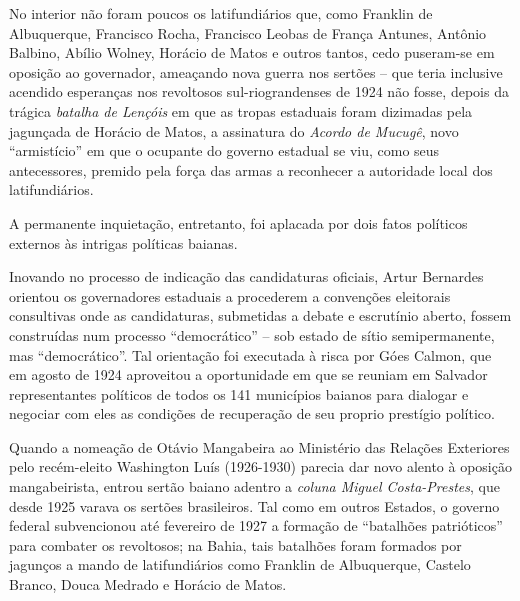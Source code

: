 No interior não foram poucos os latifundiários que, como Franklin de Albuquerque, Francisco Rocha, Francisco Leobas de França Antunes, Antônio Balbino, Abílio Wolney, Horácio de Matos e outros tantos, cedo puseram-se em oposição ao governador, ameaçando nova guerra nos sertões -- que teria inclusive acendido esperanças nos revoltosos sul-riograndenses de 1924 não fosse, depois da trágica \textit{batalha de Lençóis} em que as tropas estaduais foram dizimadas pela jagunçada de Horácio de Matos, a assinatura do \textit{Acordo de Mucugê}, novo ``armistício'' em que o ocupante do governo estadual se viu, como seus antecessores, premido pela força das armas a reconhecer a autoridade local dos latifundiários.

A permanente inquietação, entretanto, foi aplacada por dois fatos políticos externos às intrigas políticas baianas. 

Inovando no processo de indicação das candidaturas oficiais, Artur Bernardes orientou os governadores estaduais a procederem a convenções eleitorais consultivas onde as candidaturas, submetidas a debate e escrutínio aberto, fossem construídas num processo ``democrático'' -- sob estado de sítio semipermanente, mas ``democrático''. Tal orientação foi executada à risca por Góes Calmon, que em agosto de 1924 aproveitou a oportunidade em que se reuniam em Salvador representantes políticos de todos os 141 municípios baianos para dialogar e negociar com eles as condições de recuperação de seu proprio prestígio político. 

Quando a nomeação de Otávio Mangabeira ao Ministério das Relações Exteriores pelo recém-eleito Washington Luís (1926-1930) parecia dar novo alento à oposição mangabeirista, entrou sertão baiano adentro a \textit{coluna Miguel Costa-Prestes}, que desde 1925 varava os sertões brasileiros. Tal como em outros Estados, o governo federal subvencionou até fevereiro de 1927 a formação de ``batalhões patrióticos'' para combater os revoltosos; na Bahia, tais batalhões foram formados por jagunços a mando de latifundiários como Franklin de Albuquerque, Castelo Branco, Douca Medrado e Horácio de Matos. 

